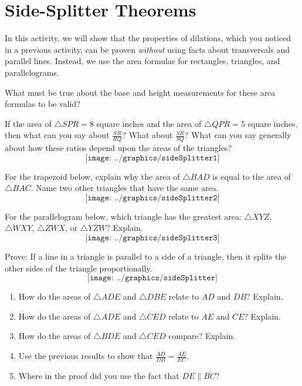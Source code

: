 \newpage

\section{Side-Splitter Theorems}
In this activity, we will show that the properties of dilations, which you noticed in a previous activity, can be proven \emph{without} using facts about transversals and parallel lines.  Instead, we use the area formulas for rectangles, triangles, and parallelograms.  
\begin{question}
What must be true about the base and height measurements for these area formulas to be valid? 
\end{question}

\begin{prob}
If the area of $\triangle SPR = 8$ square inches and the area of $\triangle QPR = 5$ square inches, then what can you say about $\frac{SR}{RQ}$?  What about $\frac{SR}{SQ}$?  What can you say generally about how these ratios depend upon the areas of the triangles?  
$$\texttt{[image: ../graphics/sideSplitter1]}$$
\end{prob}

\begin{prob}
For the trapezoid below, explain why the area of $\triangle BAD$ is equal to the area of $\triangle BAC$.  Name two other triangles that have the same area.
$$\texttt{[image: ../graphics/sideSplitter2]}$$
\end{prob}

\begin{prob}
For the parallelogram below, which triangle has the greatest area: $\triangle XYZ$, $\triangle WXY$, $\triangle ZWX$, or $\triangle YZW$?  Explain.  
$$\texttt{[image: ../graphics/sideSplitter3]}$$
\end{prob}

\begin{prob}
Prove:  If a line in a triangle is parallel to a side of a triangle, then it splits the other sides of the triangle proportionally.
$$\texttt{[image: ../graphics/sideSplitter]}$$
\begin{enumerate}
\item How do the areas of $\triangle ADE$ and $\triangle DBE$ relate to $AD$ and $DB$?  Explain.  
\item How do the areas of $\triangle ADE$ and $\triangle CED$ relate to $AE$ and $CE$?  Explain. 
\item How do the areas of $\triangle BDE$ and $\triangle CED$ compare?  Explain.  
\item Use the previous results to show that $\frac{AD}{DB} = \frac{AE}{EC}$.  
\item Where in the proof did you use the fact that $\overline{DE} \parallel \overline{BC}$?  
\end{enumerate}
\end{prob}

